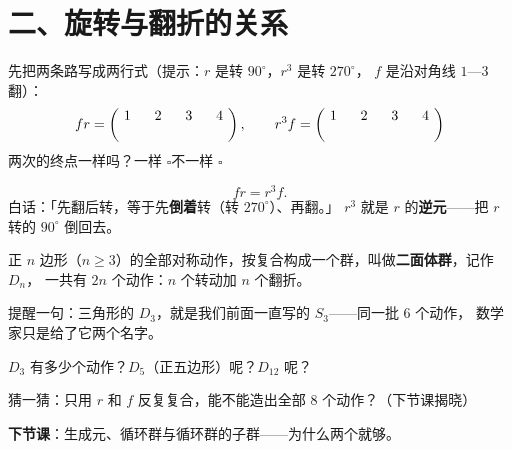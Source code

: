 \section*{二、旋转与翻折的关系}

\begin{dongshou}[左右各走一条路]
  先把两条路写成两行式（提示：\(r\) 是转 \(90^\circ\)，\(r^3\) 是转 \(270^\circ\)，
  \(f\) 是沿对角线 \(1\text{—}3\) 翻）：
  \[
    fr=\begin{pmatrix}1&2&3&4\\ \hspace{1.2em}&\hspace{1.2em}&\hspace{1.2em}&\hspace{1.2em}\end{pmatrix},
    \qquad
    r^3f=\begin{pmatrix}1&2&3&4\\ \hspace{1.2em}&\hspace{1.2em}&\hspace{1.2em}&\hspace{1.2em}\end{pmatrix}
  \]
  两次的终点一样吗？\quad 一样 \(\square\)\qquad 不一样 \(\square\)
\end{dongshou}

\begin{example}
  \[
    fr=r^3f .
  \]
  白话：「先翻后转，等于先\textbf{倒着}转（转 \(270^\circ\)）、再翻。」
  \(r^3\) 就是 \(r\) 的\textbf{逆元}——把 \(r\) 转的 \(90^\circ\) 倒回去。
\end{example}

\begin{definition}[二面体群]
  正 \(n\) 边形（\(n\ge 3\)）的全部对称动作，按复合构成一个群，叫做\textbf{二面体群}，记作 \(D_n\)，
  一共有 \(2n\) 个动作：\(n\) 个转动加 \(n\) 个翻折。
\end{definition}

\noindent 提醒一句：三角形的 \(D_3\)，就是我们前面一直写的 \(S_3\)——同一批 \(6\) 个动作，
数学家只是给了它两个名字。

\begin{sikao}
  \(D_3\) 有多少个动作？\(D_5\)（正五边形）呢？\(D_{12}\) 呢？
\end{sikao}

\begin{xiaojie}
  猜一猜：只用 \(r\) 和 \(f\) 反复复合，能不能造出全部 \(8\) 个动作？（下节课揭晓）
\end{xiaojie}

\noindent\textbf{下节课}：生成元、循环群与循环群的子群——为什么两个就够。